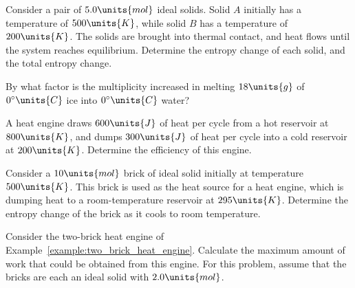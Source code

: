 \begin{problem}
  Consider a pair of $5.0\units{mol}$ ideal solids.  Solid $A$ initially has
  a temperature of $500\units{K}$, while solid $B$ has a temperature of
  $200\units{K}$.  The solids are brought into thermal contact, and
  heat flows until the system reaches equilibrium.
  Determine the entropy change of each solid, and the total entropy
  change. 
\end{problem}

\begin{problem}
  By what factor is the multiplicity increased in melting
  $18\units{g}$ of $0^\circ\units{C}$ ice into $0^\circ\units{C}$ water?
\label{prob:multiplicityformelting}
\end{problem}

\begin{problem} 
  A heat engine draws $600\units{J}$ of heat per cycle from a hot
  reservoir at $800\units{K}$, and dumps $300\units{J}$ of heat per
  cycle into a cold reservoir at $200\units{K}$.  Determine the
  efficiency of this engine.
\label{prob:simpleengine}
\end{problem}

\begin{problem}
  Consider a $10\units{mol}$  brick of ideal solid initially at temperature
  $500\units{K}$.  This brick is used as the heat source for a heat
  engine, which is dumping heat to a room-temperature reservoir at
  $295\units{K}$.
  Determine the entropy change of the brick as it cools to room
    temperature.
\label{prob:onebrickengine}
\end{problem}

\begin{problem} 
  Consider the two-brick heat engine of
  Example~\ref{example:two_brick_heat_engine}.  Calculate the maximum
  amount of work that could be obtained from this engine.  For this
  problem, assume that the bricks are each an ideal solid with 
  $2.0\units{mol}$.  
\label{prob:twobrickengine}
\end{problem}
\newpage

